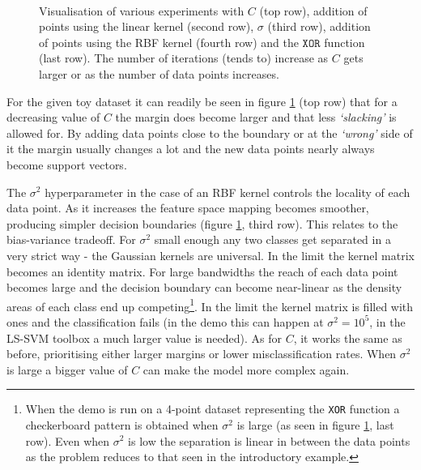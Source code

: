 \begin{figure}[ht]
\\
\caption{Visualisation of various experiments with $C$ (top row), addition of points using the linear kernel (second row), $\sigma$ (third row), addition of points using the RBF kernel (fourth row) and the $\texttt{XOR}$ function (last row). The number of iterations (tends to) increase as $C$ gets larger or as the number of data points increases.}
\label{stanfordexample}
\end{figure}
\clearpage

\par\noindent For the given toy dataset it can readily be seen in figure \ref{stanfordexample} (top row) that for a decreasing value of $C$ the margin does become larger and that less \textit{`slacking'} is allowed for. By adding data points close to the boundary or at the \textit{`wrong'} side of it the margin usually changes a lot and the new data points nearly always become support vectors.

The $\sigma^2$ hyperparameter in the case of an RBF kernel controls the locality of each data point. As it increases the feature space mapping becomes smoother, producing simpler decision boundaries (figure \ref{stanfordexample}, third row). This relates to the bias-variance tradeoff. For $\sigma^2$ small enough any two classes get separated in a very strict way - the Gaussian kernels are universal. In the limit the kernel matrix becomes an identity matrix. For large bandwidths the reach of each data point becomes large and the decision boundary can become near-linear as the density areas of each class end up competing\footnote{When the demo is run on a 4-point dataset representing the \texttt{XOR} function a checkerboard pattern is obtained when $\sigma^2$ is large (as seen in figure \ref{stanfordexample}, last row). Even when $\sigma^2$ is low the separation is linear in between the data points as the problem reduces to that seen in the introductory example.}. In the limit the kernel matrix is filled with ones and the classification fails (in the demo this can happen at $\sigma^2=10^5$, in the LS-SVM toolbox a much larger value is needed). As for $C$, it works the same as before, prioritising either larger margins or lower misclassification rates. When $\sigma^2$ is large a bigger value of $C$ can make the model more complex again. 

